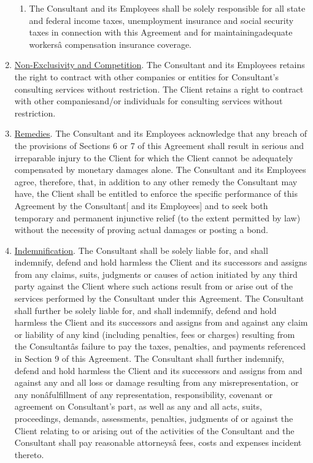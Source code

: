 \documentclass[12pt]{article}
\begin{document}
\begin{enumerate}
\begin{enumerate}
        \item The Consultant and its Employees shall be solely responsible for all state and federal income taxes, unemployment insurance and social security taxes in connection with this Agreement and for maintainingadequate workersâ compensation insurance coverage.
    \end{enumerate}
    \item \underline{Non-Exclusivity and Competition}.
    The Consultant and its Employees retains the right to contract with other companies or entities for Consultant's consulting services without restriction. The Client retains a right to contract with other companiesand/or individuals for consulting services without restriction.
    \item \underline{Remedies}. The
    Consultant and its Employees acknowledge
    that any breach of the provisions of Sections 6 or 7 of this Agreement shall result in serious and irreparable injury to the Client for which the Client cannot be adequately compensated by monetary damages alone. The
    Consultant and its Employees agree,
    therefore, that, in addition to any other remedy the Consultant may have, the Client shall be entitled to enforce the specific performance of this Agreement by the Consultant[ and its Employees] and to seek both temporary and permanent injunctive relief (to the extent permitted by law) without the necessity of proving actual damages or posting a bond.
    \item \underline{Indemnification}. The Consultant shall be solely liable for, and shall indemnify, defend and hold harmless the Client and its successors and assigns from any claims, suits, judgments or causes of action initiated by any third party against the Client where such actions result from or arise out of the services performed by the Consultant under this Agreement.  The Consultant shall further be solely liable for, and shall indemnify, defend and hold harmless the Client and its successors and assigns from and against any claim or liability of any kind (including penalties, fees or charges) resulting from the Consultantâs failure to pay the taxes, penalties, and payments referenced in Section 9 of this Agreement. The Consultant shall further indemnify, defend and hold harmless the Client and its successors and assigns from and against any and all loss or damage resulting from any misrepresentation, or any nonâfulfillment of any representation, responsibility, covenant or agreement on Consultant's part, as well as any and all acts, suits, proceedings, demands, assessments, penalties, judgments of or against the Client relating to or arising out of the activities of the Consultant and the Consultant shall pay reasonable attorneysâ fees, costs and expenses incident thereto.

\end{enumerate}
\end{document}
